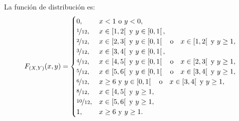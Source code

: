 \begin{ejercicio}
\begin{figure}[H]
    \end{figure}

    La función de distribución es:
    \begin{equation*}
        F_{(X,Y)}(x,y) = \begin{cases}
            0, & x<1 \text{ o } y<0, \\
            \nicefrac{1}{12}, & x\in \left[1,2\right[ \text{ y } y\in \left[0,1\right[, \\
            \nicefrac{2}{12}, & x\in \left[2,3\right[ \text{ y } y\in \left[0,1\right[ \quad \text{o} \quad x\in \left[1,2\right[ \text{ y } y\geq 1, \\
            \nicefrac{3}{12}, & x\in \left[3,4\right[ \text{ y } y\in \left[0,1\right[, \\
            \nicefrac{4}{12}, & x\in \left[4,5\right[ \text{ y } y\in \left[0,1\right[ \quad \text{o} \quad x\in \left[2,3\right[ \text{ y } y\geq 1, \\
            \nicefrac{5}{12}, & x\in \left[5,6\right[ \text{ y } y\in \left[0,1\right[ \quad \text{o} \quad x\in \left[3,4\right[ \text{ y } y\geq 1, \\
            \nicefrac{6}{12}, & x\geq 6 \text{ y } y\in \left[0,1\right[ \quad \text{o} \quad x\in \left[3,4\right[ \text{ y } y\geq 1, \\
            \nicefrac{8}{12}, & x\in \left[4,5\right[ \text{ y } y\geq 1, \\
            \nicefrac{10}{12}, & x\in \left[5,6\right[ \text{ y } y\geq 1, \\
            1, & x\geq 6 \text{ y } y\geq 1.
        \end{cases}
    \end{equation*}
\end{ejercicio}

